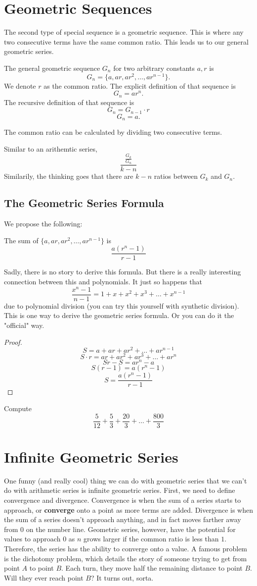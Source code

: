 \section{Geometric Sequences}
The second type of special sequence is a geometric sequence. This is where any two consecutive terms have the same common ratio. This leads us to our general geometric series.
\begin{definition}
    The general geometric sequence $G_n$ for two arbitrary constants $a, r$ is 
    \[G_n=\{a, ar, ar^2, \dots, ar^{n-1}\}.\]
    We denote $r$ as the common ratio.
    The explicit definition of that sequence is
    \[G_n=ar^n.\]
    The recursive definition of that sequence is
    \[G_n=G_{n-1}\cdot r\]
    \[G_n=a.\]
\end{definition}
The common ratio can be calculated by dividing two consecutive terms.

Similar to an arithemtic series, 
\[\frac{\frac{G_k}{G_n}}{k-n}\]
Similarily, the thinking goes that there are $k-n$ ratios between $G_k$ and $G_n$.
\subsection{The Geometric Series Formula}
We propose the following:
\begin{lemma}
    The sum of $\{a, ar, ar^2,\dots,ar^{n-1}\}$ is 
    \[\frac{a(r^n-1)}{r-1}\]
\end{lemma}
Sadly, there is no story to derive this formula. But there is a really interesting connection between this and polynomials. It just so happens that 
\[\frac{x^n-1}{n-1}=1+x+x^2+x^3+\dots+x^{n-1}\]
due to polynomial division (you can try this yourself with synthetic division). This is one way to derive the geometric series formula. Or you can do it the "official" way.
\begin{proof}
    \[S=a+ar+ar^2+\dots+ar^{n-1}\]
    \[S\cdot r=ar+ar^2+ar^3+\dots+ar^n\]
    \[Sr-S=ar^n-a\]
    \[S(r-1)=a(r^n-1)\]
    \[S=\frac{a(r^n-1)}{r-1}\]
\end{proof}
\begin{problem}
    Compute
    \[\frac{5}{12}+\frac{5}{3}+\frac{20}{3}+\dots+\frac{800}{3}\]
\end{problem}
\section{Infinite Geometric Series}
One funny (and really cool) thing we can do with geometric series that we can't do with arithmetic series is infinite geometric series. First, we need to define convergence and divergence. Convergence is when the sum of a series starts to approach, or \textbf{converge} onto a point as more terms are added. Divergence is when the sum of a series doesn't approach anything, and in fact moves farther away from $0$ on the number line.
Geometric series, however, have the potential for values to approach $0$ as $n$ grows larger if the common ratio is less than $1$. Therefore, the series has the ability to converge onto a value.
A famous problem is the dichotomy problem, which details the story of someone trying to get from point $A$ to point $B$. Each turn, they move half the remaining distance to point $B$. Will they ever reach point $B$? It turns out, sorta. 
